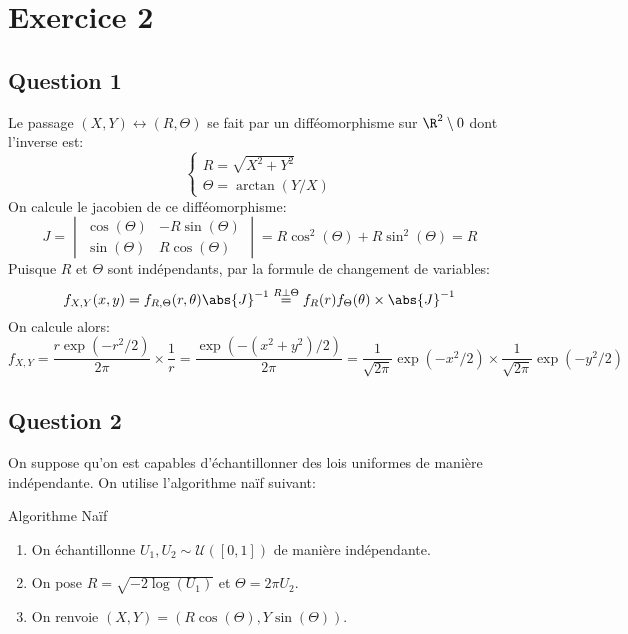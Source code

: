 \documentclass[math, info]{mpb-cours}
\begin{document}
\section{Exercice 2}
\subsection{Question 1}
Le passage $(X, Y) \leftrightarrow (R, \Theta)$ se fait par un difféomorphisme sur $\R^{2} \setminus 0$ dont l'inverse est:
\begin{equation*}
	\begin{cases}
		R = \sqrt{X^{2} + Y^{2}} \\
		\Theta = \arctan(Y / X)
	\end{cases}
\end{equation*}
On calcule le jacobien de ce difféomorphisme:
\begin{equation*}
	J =
	\begin{vmatrix}
		\cos(\Theta) & -R \sin(\Theta) \\
		\sin(\Theta) & R\cos(\Theta)
	\end{vmatrix} = R\cos^{2}(\Theta) + R\sin^{2}(\Theta) = R
\end{equation*}
Puisque $R$ et $\Theta$ sont indépendants, par la formule de changement de variables:
\begin{equation*}
	f_{X, Y}(x, y) = f_{R, \Theta}(r, \theta) \abs{J}^{- 1} \overset{R \bot \Theta}{=}f_{R}(r)f_{\Theta}(\theta) \times \abs{J}^{-1}
\end{equation*}
On calcule alors:
\begin{equation*}
	f_{X, Y} = \frac{r\exp(-r^{2}/2)}{2\pi} \times \frac{1}{r} = \frac{\exp(-(x^{2} + y^{2})/ 2)}{2\pi} = \frac{1}{\sqrt{2\pi}}\exp(-x^{2}/2)\times \frac{1}{\sqrt{2\pi}}\exp(-y^{2}/2)
\end{equation*}

\subsection{Question 2}
On suppose qu'on est capables d'échantillonner des lois uniformes de manière indépendante.
On utilise l'algorithme naïf suivant:

\begin{algorithm}
	\caption{Algorithme Naïf}
	\begin{enumerate}
		\item On échantillonne $U_{1}, U_{2} \sim \mathcal{U}([0, 1])$ de manière indépendante.
		\item On pose $R = \sqrt{-2 \log(U_{1})}$ et $\Theta = 2\pi U_{2}$.
		\item On renvoie $(X, Y) = (R\cos(\Theta), Y\sin(\Theta))$.
	\end{enumerate}
\end{algorithm}
\end{document}
